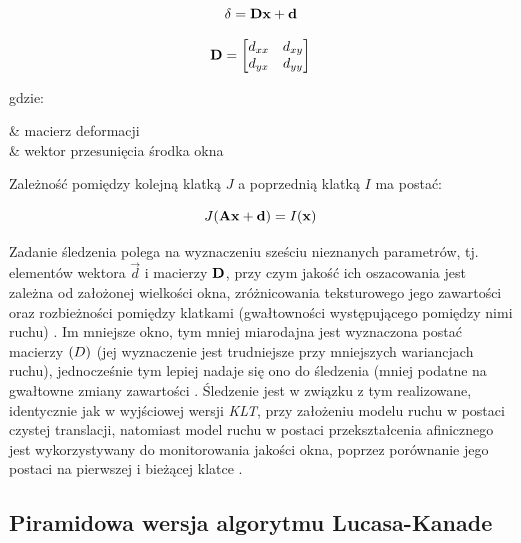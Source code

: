 \begin{equation}
\label{equ:Algorytmu_Lucasa_Kanade_Tomasi_Shi_model_afiniczny}
	\mathbf{\delta} = \mathbf{D}\mathbf{x} + \mathbf{d}
\end{equation}

\begin{equation}
\label{equ:Algorytmu_Lucasa_Kanade_Tomasi_Shi_macierz_deformacji}
	\mathbf{D} =
	\begin{bmatrix}
		d_{xx} & d_{xy} \\
		d_{yx} & d_{yy} \\	
	\end{bmatrix}
\end{equation}

\noindent
gdzie:
\begin{conditions}
	 & macierz deformacji \\
	 & wektor przesunięcia środka okna \\
\end{conditions}

Zależność pomiędzy kolejną klatką $J$ a poprzednią klatką $I$ ma postać:

\begin{equation}
\label{equ:Algorytmu_Lucasa_Kanade_Tomasi_Shi_zaleznosc_klatek}
	J(\mathbf{A}\mathbf{x} + \mathbf{d}) = I(\mathbf{x})
\end{equation}

Zadanie śledzenia polega na wyznaczeniu sześciu nieznanych parametrów, tj. elementów wektora $\vec{d}$ i macierzy $\mathbf{D}$, przy czym jakość ich oszacowania jest zależna od założonej wielkości okna, zróżnicowania teksturowego jego zawartości oraz rozbieżności pomiędzy klatkami (gwałtowności występującego pomiędzy nimi ruchu) \cite{Shi1994}. Im mniejsze okno, tym mniej miarodajna jest wyznaczona postać macierzy $\mathbf{(}D)$ (jej wyznaczenie jest trudniejsze przy mniejszych wariancjach ruchu), jednocześnie tym lepiej nadaje się ono do śledzenia (mniej podatne na gwałtowne zmiany zawartości \cite{Tomasi1991} \cite{Shi1994}. Śledzenie jest w związku z tym realizowane, identycznie jak w wyjściowej wersji \textit{KLT}, przy założeniu modelu ruchu w postaci czystej translacji, natomiast model ruchu w postaci przekształcenia afinicznego jest wykorzystywany do monitorowania jakości okna, poprzez porównanie jego postaci na pierwszej i bieżącej klatce \cite{Shi1994}.

\subsection{Piramidowa wersja algorytmu Lucasa-Kanade}
\label{subsec:Piramidowa_wersja_algorytmu_Lucasa_Kanade}

